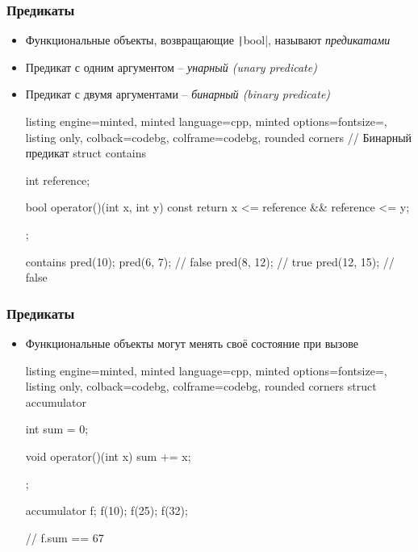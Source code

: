 \documentclass[10pt]{beamer}
\begin{document}
\begin{frame}[fragile]
\frametitle{Предикаты}
\begin{itemize}
\item Функциональные объекты, возвращающие \texttt|bool|, называют \textit{предикатами}
\pause
\item Предикат с одним аргументом -- \textit{унарный (unary predicate)}
\pause
\item Предикат с двумя аргументами -- \textit{бинарный (binary predicate)}
\pause
{}
\begin{tcblisting}{listing engine=minted, minted language=cpp, minted options={fontsize=\scriptsize}, listing only, colback=codebg, colframe=codebg, rounded corners}
// Бинарный предикат
struct contains {
  int reference;

  bool operator()(int x, int y) const {
    return x <= reference && reference <= y;
  }
};

contains pred(10);
pred(6, 7); // false
pred(8, 12); // true
pred(12, 15); // false
\end{tcblisting}
\end{itemize}
\end{frame}

\begin{frame}[fragile]
\frametitle{Предикаты}
\begin{itemize}
\item Функциональные объекты могут менять своё состояние при вызове
\pause
{}
\begin{tcblisting}{listing engine=minted, minted language=cpp, minted options={fontsize=\scriptsize}, listing only, colback=codebg, colframe=codebg, rounded corners}
struct accumulator {
  int sum = 0;

  void operator()(int x) {
    sum += x;
  }
};

accumulator f;
f(10);
f(25);
f(32);

// f.sum == 67
\end{tcblisting}
\end{itemize}
\end{frame}
\end{document}
